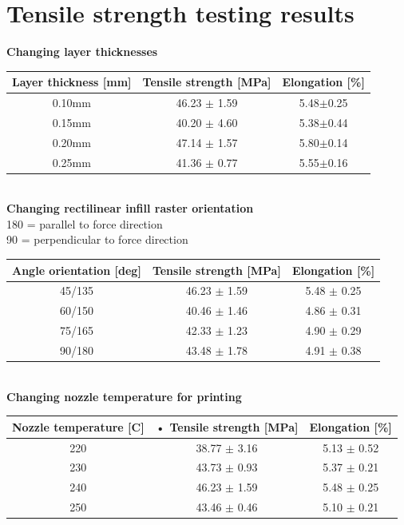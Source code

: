 \documentclass[a4paper, twoside, 11pt]{report}
\begin{document}
\section{Tensile strength testing results}
\textbf{Changing layer thicknesses}\\
\begin{tabular}{|c|c|c|}
\hline 
Layer thickness [mm] & Tensile strength [MPa] & Elongation [\%]\\ 
\hline 
0.10mm & 46.23 $\pm$ 1.59 & 5.48$\pm$0.25\\ 
\hline 
0.15mm & 40.20 $\pm$ 4.60 & 5.38$\pm$0.44\\ 
\hline 
0.20mm & 47.14 $\pm$ 1.57 & 5.80$\pm$0.14\\ 
\hline 
0.25mm & 41.36 $\pm$ 0.77 & 5.55$\pm$0.16\\ 
\hline 
\end{tabular}
\\[20pt]
%
\textbf{Changing rectilinear infill raster orientation}\\
180 = parallel to force direction\\
90 = perpendicular to force direction\\
\begin{tabular}{|c|c|c|}
\hline 
Angle orientation [deg] & Tensile strength [MPa] & Elongation [\%]\\ 
\hline 
45/135 & 46.23 $\pm$ 1.59 & 5.48 $\pm$ 0.25\\ 
\hline 
60/150 & 40.46  $\pm$ 1.46 & 4.86 $\pm$ 0.31\\ 
\hline 
75/165 & 42.33 $\pm$ 1.23 & 4.90 $\pm$ 0.29\\ 
\hline 
90/180 & 43.48 $\pm$ 1.78 & 4.91 $\pm$ 0.38\\ 
\hline 
\end{tabular}
\\[20pt]
%
\textbf{Changing nozzle temperature for printing}\\
\begin{tabular}{|c|c|c|}
\hline 
Nozzle temperature [C] & • Tensile strength [MPa] & Elongation [\%]\\ 
\hline 
220 & 38.77 $\pm$ 3.16 & 5.13 $\pm$ 0.52\\ 
\hline 
230 & 43.73 $\pm$ 0.93 & 5.37 $\pm$ 0.21 \\ 
\hline 
240 & 46.23 $\pm$ 1.59 & 5.48 $\pm$ 0.25 \\ 
\hline 
250 & 43.46 $\pm$ 0.46 & 5.10 $\pm$ 0.21\\ 
\hline 
\end{tabular}
\\[20pt]
\end{document}
